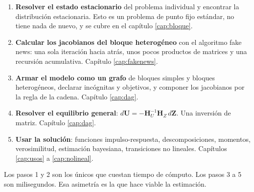 \begin{receta}
\begin{enumerate}[leftmargin=1.4em,itemsep=2pt]
\item \textbf{Resolver el estado estacionario} del problema individual y
encontrar la distribución estacionaria. Esto es un problema de punto fijo
estándar, no tiene nada de nuevo, y se cubre en el capítulo \ref{cap:bloque}.
\item \textbf{Calcular los jacobianos del bloque heterogéneo} con el algoritmo
fake news: una sola iteración hacia atrás, unos pocos productos de matrices y una
recursión acumulativa. Capítulo \ref{cap:fakenews}.
\item \textbf{Armar el modelo como un grafo} de bloques simples y bloques
heterogéneos, declarar incógnitas y objetivos, y componer los jacobianos por la
regla de la cadena. Capítulo \ref{cap:dag}.
\item \textbf{Resolver el equilibrio general}: $d\mathbf{U} = -\mathbf{H}_U^{-1}
\mathbf{H}_Z\, d\mathbf{Z}$. Una inversión de matriz. Capítulo \ref{cap:dag}.
\item \textbf{Usar la solución}: funciones impulso-respuesta, descomposiciones,
momentos, verosimilitud, estimación bayesiana, transiciones no lineales.
Capítulos \ref{cap:usos} a \ref{cap:nolineal}.
\end{enumerate}
\end{receta}

Los pasos 1 y 2 son los únicos que cuestan tiempo de cómputo. Los pasos 3 a 5
son milisegundos. Esa asimetría es la que hace viable la estimación.
